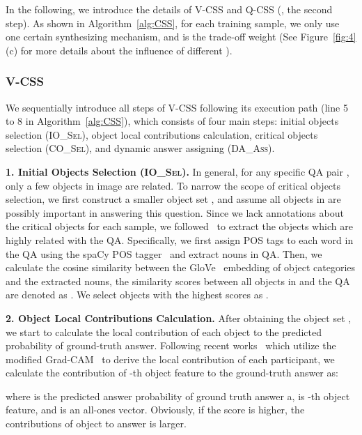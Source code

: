 \documentclass[10pt,twocolumn,letterpaper]{article}
\begin{document}
In the following, we introduce the details of V-CSS and Q-CSS (\ie, the second step). As shown in Algorithm~\ref{alg:CSS}, for each training sample, we only use one certain synthesizing mechanism, and  is the trade-off weight (See Figure~\ref{fig:4} (c) for more details about the influence of different ).

\subsubsection{V-CSS} \label{sec:v-css}

We sequentially introduce all steps of V-CSS following its execution path (line 5 to 8 in Algorithm~\ref{alg:CSS}), which consists of four main steps: initial objects selection (\textsc{IO\_Sel}), object local contributions calculation, critical objects selection (\textsc{CO\_Sel}), and dynamic answer assigning (\textsc{DA\_Ass}).

\textbf{1. Initial Objects Selection (\textsc{IO\_Sel}).} In general, for any specific QA pair , only a few objects in image  are related. To narrow the scope of critical objects selection, we first construct a smaller object set , and assume all objects in  are possibly important in answering this question. Since we lack annotations about the critical objects for each sample, we followed~\cite{wu2019self} to extract the objects which are highly related with the QA. Specifically, we first assign POS tags to each word in the QA using the spaCy POS tagger~\cite{honnibal2017spacy} and extract nouns in QA. Then, we calculate the cosine similarity between the GloVe~\cite{pennington2014glove} embedding of object categories and the extracted nouns, the similarity scores between all objects in  and the QA are denoted as . We select  objects with the highest  scores as . 

\textbf{2. Object Local Contributions Calculation.} After obtaining the object set , we start to calculate the local contribution of each object to the predicted probability of ground-truth answer. Following recent works~\cite{jain2019attention, selvaraju2019taking, wu2019self} which utilize the modified Grad-CAM~\cite{selvaraju2017grad} to derive the local contribution of each participant, we calculate the contribution of -th object feature to the ground-truth answer  as:

where  is the predicted answer probability of ground truth answer a,   is -th object feature, and  is an all-ones vector. Obviously, if the score  is higher, the contributions of object  to answer  is larger.
\end{document}
